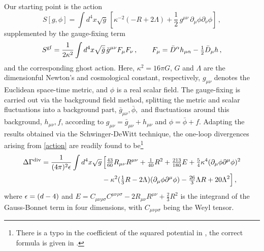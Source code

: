 \documentclass[preprint,preprintnumbers,amsmath,amssymb,nofootinbib,APS]{revtex4}
\newcommand{\be}{\begin{equation}}
\newcommand{\ee}{\end{equation}}
\let\m=\mu    \let\n=\nu    \let\x=\xi      \let\r=\rho \let\om=\omega
\let\s=\sigma \let\t=\tau   \let\vph=\varphi \let\ph=\phi \let\c=\chi
\let\G=\Gamma \let\D=\Delta  \let\Th=\Theta \let\L=\Lambda \let\X=\Xi
\newcommand{\2}{\sqrt{2\,}}
\newcommand{\gb}{\bar{g}}
\newcommand{\p}{\partial}
\newcommand{\Db}{\bar{D}}
\begin{document}
Our starting point is the action 
%
\be\label{action}
S[g, \phi] =  \int d^4x \sqrt{g} \, \left[ \kappa^{-2} (-R + 2 \Lambda) + \frac{1}{2} \, g^{\mu\nu} \, \p_\mu \phi \p_\nu \phi \right] \, ,
\ee
%
supplemented by the gauge-fixing term
%
\be\label{S:gf}
S^{\rm gf} = \frac{1}{2\kappa^2} \int d^4 x \sqrt{\gb} \, \gb^{\mu\nu} F_\mu F_\nu \, , \qquad F_\mu = \Db^\alpha h_{\mu \alpha} - \tfrac{1}{2} \Db_\mu h \, ,
\ee
%
and the corresponding ghost action. Here, $\kappa^2 = 16 \pi G$, $G$ and $\Lambda$ are the dimensionful Newton's and cosmological constant, respectively, $g_{\mu\nu}$ denotes the Euclidean space-time metric, and $\phi$ is a real scalar field. The gauge-fixing is carried out via the background field method, splitting the metric and scalar fluctuations into a background part, $\gb_{\mu\nu}, \bar{\phi},$ and fluctuations around this background, $h_{\mu\nu}, f$, according to $g_{\mu\nu} = \gb_{\mu\nu} + h_{\mu\nu}$ and $\phi = \bar{\phi} + f $.  Adapting the results \cite{Gryzov-Barvinsky,Barvinsky:1993zg} obtained via the Schwinger-DeWitt technique, the one-loop divergences arising from \eqref{action} are readily found to be\footnote{There is a typo in the coefficient of the squared potential in \cite{Barvinsky:1993zg}, the correct formula is given in \cite{Gryzov-Barvinsky}.}
%
\be\label{CT}
\begin{split}
\Delta\G^{\rm div}  = \frac{1}{(4 \pi)^2 \eps} \int d^4x \sqrt{g} & \, \Big[
\tfrac{43}{60} R_{\mu\nu} R^{\mu \nu} + \tfrac{1}{40} R^2 +\tfrac{213}{180} E + \tfrac{5}{4} \kappa^4  (\p_\mu \phi \p^\mu \phi)^2 \\ 
& - \kappa^2 (\tfrac{1}{3} R - 2 \Lambda) (\p_\mu \phi \p^\mu \phi) - \tfrac{26}{3} \Lambda R + 20 \Lambda^2
\Big] \, ,
\end{split}
\ee 
%
where $\epsilon = (d-4)$ and $E=C_{\m\n\r\s} C^{\m\n\r\s}-2 R_{\m\n}R^{\m\n}+ \tfrac{2}{3}R^2$ is the integrand of the Gauss-Bonnet term in four dimensions, with $C_{\m\n\r\s}$ being the Weyl tensor.
\end{document}
